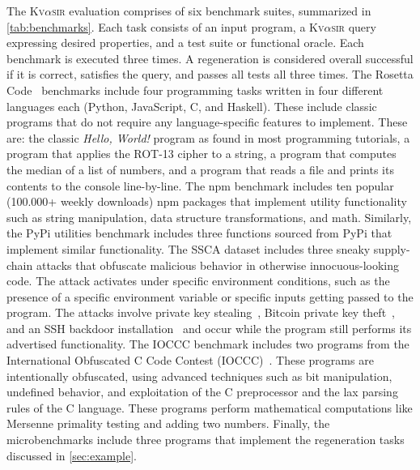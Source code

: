 \documentclass[nonacm,sigplan,review]{acmart}
\newcommand{\sys}{{\scshape Kv{$\alpha$}sir}\xspace}
\begin{document}
The \sys evaluation comprises of six benchmark suites, summarized in \cref{tab:benchmarks}.
Each task consists of an input program, a \sys query expressing desired
properties, and a test suite or functional oracle.
Each benchmark is executed three times. A regeneration is considered overall successful 
if it is correct, satisfies the query, and passes all tests all three times.
The Rosetta Code~\cite{rosettacode} benchmarks include four programming tasks written in four different
languages each (Python, JavaScript, C, and Haskell). 
These include classic programs that do not require any language-specific features to implement.
These are: the classic \emph{Hello, World!} program as found in most programming tutorials,
a program that applies the ROT-13 cipher to a string,
a program that computes the median of a list of numbers,
and a program that reads a file and prints its contents to the console line-by-line.
The npm benchmark includes ten popular (100.000+ weekly downloads) npm packages that implement utility
functionality such as string manipulation, data structure transformations, and math.
Similarly, the PyPi utilities benchmark includes three functions sourced from PyPi that implement similar functionality.
The SSCA dataset includes three sneaky supply-chain attacks that obfuscate malicious behavior in otherwise innocuous-looking code.
The attack activates under specific environment conditions, such as the presence of a specific environment variable or specific inputs
getting passed to the program. The attacks involve private key stealing~\cite{ohm2020backstabber}, Bitcoin private key theft~\cite{ev:eurosec:2022}, and an SSH backdoor installation~\cite{copeland2019frightening}
and occur while the program still performs its advertised functionality.
The IOCCC benchmark includes two programs from the International Obfuscated C Code Contest (IOCCC)~\cite{ioccc}.
These programs are intentionally obfuscated, using advanced techniques such as bit manipulation, undefined behavior,
and exploitation of the C preprocessor and the lax parsing rules of the C language.
These programs perform mathematical computations like Mersenne primality testing and adding two numbers.
Finally, the microbenchmarks include three programs that implement the regeneration tasks discussed in \cref{sec:example}.
\end{document}
